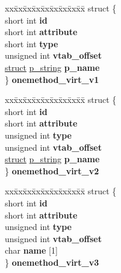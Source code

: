 \begin{DoxyCompactItemize}
\begin{tabbing}
\end{tabbing}\item 
\mbox{\label{unioncodeview__fieldtype_af54afd5dc6119e0c34e153044d873eaf}} 
\begin{tabbing}
xx\=xx\=xx\=xx\=xx\=xx\=xx\=xx\=xx\=\kill
struct \{\\
\>short int {\bfseries id}\\
\>short int {\bfseries attribute}\\
\>short int {\bfseries type}\\
\>unsigned int {\bfseries vtab\_offset}\\
\>\hyperlink{interfacestruct}{struct} \hyperlink{structp__string}{p\_string} {\bfseries p\_name}\\
\} {\bfseries onemethod\_virt\_v1}\\

\end{tabbing}\item 
\mbox{\label{unioncodeview__fieldtype_a147f4d62e55d81f8e947199a8e417620}} 
\begin{tabbing}
xx\=xx\=xx\=xx\=xx\=xx\=xx\=xx\=xx\=\kill
struct \{\\
\>short int {\bfseries id}\\
\>short int {\bfseries attribute}\\
\>unsigned int {\bfseries type}\\
\>unsigned int {\bfseries vtab\_offset}\\
\>\hyperlink{interfacestruct}{struct} \hyperlink{structp__string}{p\_string} {\bfseries p\_name}\\
\} {\bfseries onemethod\_virt\_v2}\\

\end{tabbing}\item 
\mbox{\label{unioncodeview__fieldtype_a731f81568494c1c64755cf9ae92e3667}} 
\begin{tabbing}
xx\=xx\=xx\=xx\=xx\=xx\=xx\=xx\=xx\=\kill
struct \{\\
\>short int {\bfseries id}\\
\>short int {\bfseries attribute}\\
\>unsigned int {\bfseries type}\\
\>unsigned int {\bfseries vtab\_offset}\\
\>char {\bfseries name} \mbox{[}1\mbox{]}\\
\} {\bfseries onemethod\_virt\_v3}\\


\end{tabbing}
\end{DoxyCompactItemize}

